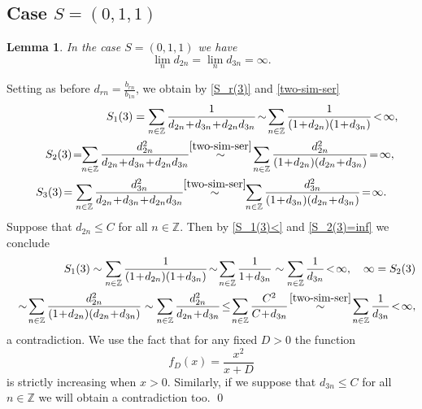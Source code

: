 \documentclass[preprint,12pt]{elsarticle}
\newtheorem{lem}[thm]{Lemma}
\numberwithin{equation}{section}
\begin{document}
\subsection{Case $S=(0,1,1)$}
%
\begin{lem}
\label{l.(011)} 
In the case $S=(0,1,1)$
we have 
\begin{equation}
\label{(011)} 
\lim_nd_{2n}=\lim_nd_{3n}=\infty.
\end{equation}
\end{lem}
%
\begin{pf} Setting  as before $d_{rn}\!=\!\frac{b_{rn}}{b_{1n}}$,  we obtain
by  \eqref{S_r(3)}  and \eqref{two-sim-ser}
\begin{eqnarray}
\label{S_1(3)<}
 &&S_1(3)=
 \sum_{n\in \mathbb Z}\frac{1}{d_{2n}\!+\!d_{3n}\!+\!d_{2n}d_{3n}}\!\sim\! 
  \sum_{n\in \mathbb Z}\frac{1}{(1\!+\!d_{2n})(1\!+\!d_{3n})}
 \!<\!\infty,\\
\label{S_2(3)=inf}
&&
S_2(3)\!=\!\!
 \sum_{n\in \mathbb Z}\frac{d_{2n}^2}{d_{2n}\!+\!d_{3n}\!+\!d_{2n}d_{3n}}\!\!
 \stackrel{\eqref{two-sim-ser}}{\sim} \!
  \sum_{n\in \mathbb Z}\frac{d_{2n}^2}{(1\!+\!d_{2n})(d_{2n}\!+\!d_{3n})}\!=\!\infty,\,\,\\
  \label{S_(3)=inf}
  &&
  S_3(3)\!=\!\!\
 \sum_{n\in \mathbb Z}\frac{d_{3n}^2}{d_{2n}\!+\!d_{3n}\!+\!d_{2n}d_{3n}}\!\!\stackrel{\eqref{two-sim-ser}}{\sim} \! \!
  \sum_{n\in \mathbb Z}\frac{d_{3n}^2}{(1\!+\!d_{3n})(d_{2n}\!+\!d_{3n})}\!=\!\infty.\quad
\end{eqnarray}
%
Suppose that $d_{2n}\leq C$ for all $n\in \mathbb Z$. Then by \eqref{S_1(3)<} and \eqref{S_2(3)=inf} we conclude
\begin{eqnarray*}
 &&S_1(3) \sim\sum_{n\in \mathbb Z}\frac{1}{(1\!+\!d_{2n})(1\!+\!d_{3n})}\!\sim\! 
 \sum_{n\in \mathbb Z}\frac{1}{1\!+\!d_{3n}}\sim
  \sum_{n\in \mathbb Z}\frac{1}{d_{3n}}
 \!<\!\infty,\quad\infty=S_2(3)\\
&&
\sim\!
  \sum_{n\in \mathbb Z}\frac{d_{2n}^2}{(1\!+\!d_{2n})(d_{2n}\!+\!d_{3n})}\sim
  \sum_{n\in \mathbb Z}\frac{d_{2n}^2}{d_{2n}\!+\!d_{3n}}\!\leq\! 
\sum_{n\in \mathbb Z}\frac{C^2}{C\!+\!d_{3n}}\!\stackrel{\eqref{two-sim-ser}}{\sim}\! \sum_{n\in \mathbb Z}\frac{1}{d_{3n}}
\!<\!\infty,
\end{eqnarray*}
a contradiction. 
We use the fact that for any fixed $D>0$  the function
$$
f_D(x)=\frac{x^2}{x+D}
$$  is  strictly increasing when $x>0$.
%
Similarly, if we suppose that $d_{3n}\leq C$ for all $n\in \mathbb Z$ we will obtain a contradiction too.
\qed\end{pf}
\end{document}
